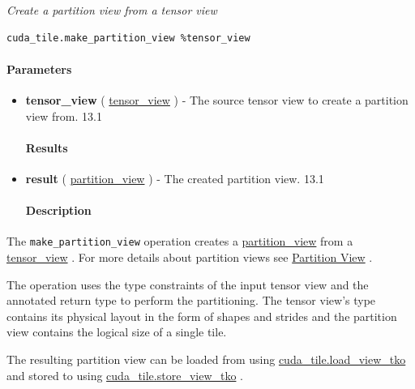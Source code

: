 \documentclass{article}
\begin{document}
\textit{Create a partition view from a tensor view}


\begin{lstlisting}
cuda_tile.make_partition_view %tensor_view
\end{lstlisting}

\paragraph{Parameters}

\begin{itemize}
\item \textbf{tensor\_view} ( \href{https://docs.nvidia.com/cuda/tile-ir/latest/sections/types.html#type-tensor-view}{tensor\_view} ) - The source tensor view to create a partition view from. 13.1


\paragraph{Results}

\item \textbf{result} ( \href{https://docs.nvidia.com/cuda/tile-ir/latest/sections/types.html#type-partition-view}{partition\_view} ) - The created partition view. 13.1


\paragraph{Description}

\end{itemize}
The \texttt{make\_partition\_view} operation creates a \href{https://docs.nvidia.com/cuda/tile-ir/latest/sections/types.html#type-partition-view}{partition\_view} from a \href{https://docs.nvidia.com/cuda/tile-ir/latest/sections/types.html#type-tensor-view}{tensor\_view} . For more details about partition views see \href{https://docs.nvidia.com/cuda/tile-ir/latest/sections/types.html#type-partition-view}{Partition View} .


The operation uses the type constraints of the input tensor view and the annotated return type to perform the partitioning. The tensor view's type contains its physical layout in the form of shapes and strides and the partition view contains the logical size of a single tile.


The resulting partition view can be loaded from using \href{https://docs.nvidia.com/cuda/tile-ir/latest/sections/operations.html#op-cuda-tile-load-view-tko}{cuda\_tile.load\_view\_tko} and stored to using \href{https://docs.nvidia.com/cuda/tile-ir/latest/sections/operations.html#op-cuda-tile-store-view-tko}{cuda\_tile.store\_view\_tko} .
\end{document}

